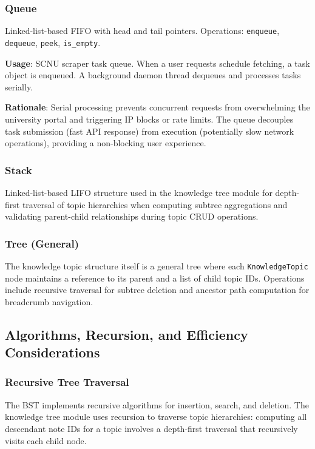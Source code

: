 \documentclass[11pt,a4paper]{article}
\begin{document}
\subsubsection{Queue}
Linked-list-based FIFO with head and tail pointers. Operations: \texttt{enqueue}, \texttt{dequeue}, \texttt{peek}, \texttt{is\_empty}.

\textbf{Usage}: SCNU scraper task queue. When a user requests schedule fetching, a task object is enqueued. A background daemon thread dequeues and processes tasks serially.

\textbf{Rationale}: Serial processing prevents concurrent requests from overwhelming the university portal and triggering IP blocks or rate limits. The queue decouples task submission (fast API response) from execution (potentially slow network operations), providing a non-blocking user experience.

\subsubsection{Stack}
Linked-list-based LIFO structure used in the knowledge tree module for depth-first traversal of topic hierarchies when computing subtree aggregations and validating parent-child relationships during topic CRUD operations.

\subsubsection{Tree (General)}
The knowledge topic structure itself is a general tree where each \texttt{KnowledgeTopic} node maintains a reference to its parent and a list of child topic IDs. Operations include recursive traversal for subtree deletion and ancestor path computation for breadcrumb navigation.

\subsection{Algorithms, Recursion, and Efficiency Considerations}

\subsubsection{Recursive Tree Traversal}
The BST implements recursive algorithms for insertion, search, and deletion. The knowledge tree module uses recursion to traverse topic hierarchies: computing all descendant note IDs for a topic involves a depth-first traversal that recursively visits each child node.
\end{document}
